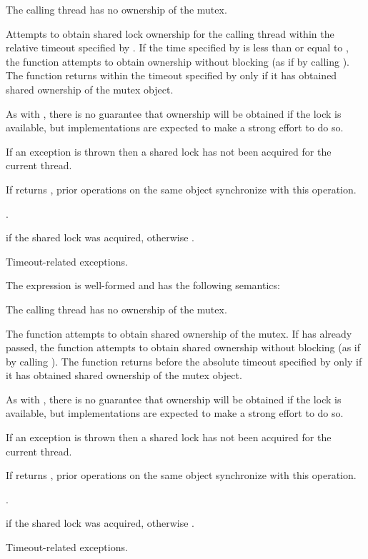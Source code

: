 \begin{itemdescr}
\pnum
\expects
The calling thread has no ownership of the mutex.

\pnum
\effects
Attempts to obtain
shared lock ownership for the calling thread within the relative
timeout specified by . If the time
specified by  is less than or equal to ,
the function attempts to obtain ownership without blocking (as if by calling
). The function returns within the timeout
specified by  only if it has obtained shared ownership of the
mutex object.
\begin{note}
As with , there is no guarantee that
ownership will be obtained if the lock is available, but implementations are
expected to make a strong effort to do so.
\end{note}
If an exception is thrown then a shared lock has not been acquired for
the current thread.

\pnum
\sync
If  returns , prior
 operations on the same object synchronize
with this operation.

\pnum
\returntype {}.

\pnum
\returns
{} if the shared lock was acquired, otherwise .

\pnum
\throws
Timeout-related exceptions.
\end{itemdescr}

\pnum
The expression  is well-formed
and has the following semantics:

\begin{itemdescr}
\pnum
\expects
The calling thread has no ownership of the mutex.

\pnum
\effects
The function attempts to obtain shared ownership of the mutex. If
 has already passed, the function attempts to obtain shared
ownership without blocking (as if by calling ). The
function returns before the absolute timeout
specified by  only if it has obtained shared ownership of the
mutex object.
\begin{note}
As with , there is no guarantee that
ownership will be obtained if the lock is available, but implementations are
expected to make a strong effort to do so.
\end{note}
If an exception is thrown then a shared lock has not been acquired for
the current thread.

\pnum
\sync
If  returns , prior
 operations on the same object synchronize
with this operation.

\pnum
\returntype {}.

\pnum
\returns
{} if the shared lock was acquired, otherwise .

\pnum
\throws
Timeout-related exceptions.
\end{itemdescr}

